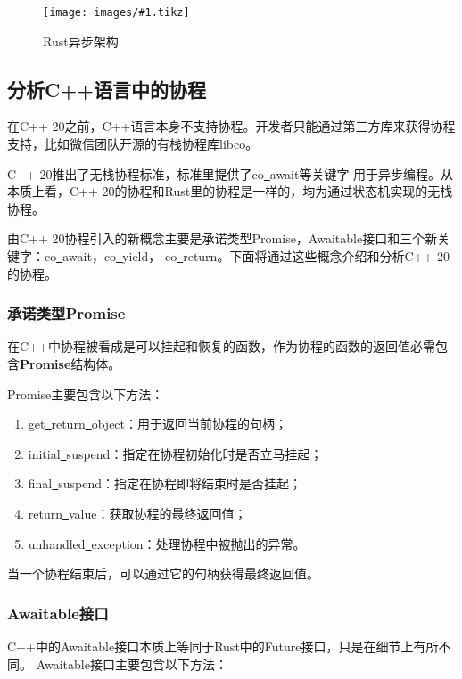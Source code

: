 \documentclass[supercite]{HustGraduPaper}
\newcommand{\cfig}[3]{
  \begin{figure}[htb]
    \centering
    \texttt{[image: images/\#1.tikz]}
    \caption{#3}
    \label{fig:#1}
  \end{figure}
}
\theoremstyle{definition}
\begin{document}
\cfig{rust-async}{0.9}{Rust异步架构}

\subsection{分析C++语言中的协程}
在C++ 20之前，C++语言本身不支持协程。开发者只能通过第三方库来获得协程支持，比如微信团队开源的有栈协程库libco。\par

C++ 20推出了无栈协程标准，标准里提供了co\underline{~}await等关键字
用于异步编程。从本质上看，C++ 20的协程和Rust里的协程是一样的，均为通过状态机实现的无栈协程。\par

由C++ 20协程引入的新概念主要是承诺类型Promise，Awaitable接口和三个新关键字：co\underline{~}await，co\underline{~}yield，
co\underline{~}return。下面将通过这些概念介绍和分析C++ 20的协程。\par

\subsubsection{承诺类型Promise}

在C++中协程被看成是可以挂起和恢复的函数，作为协程的函数的返回值必需包含\textbf{Promise}结构体。\par

Promise主要包含以下方法：

\begin{enumerate}
  \item get\underline{~}return\underline{~}object：用于返回当前协程的句柄；
  \item initial\underline{~}suspend：指定在协程初始化时是否立马挂起；
  \item final\underline{~}suspend：指定在协程即将结束时是否挂起；
  \item return\underline{~}value：获取协程的最终返回值；
  \item unhandled\underline{~}exception：处理协程中被抛出的异常。
\end{enumerate}

当一个协程结束后，可以通过它的句柄获得最终返回值。\par

\subsubsection{Awaitable接口}

C++中的Awaitable接口本质上等同于Rust中的Future接口，只是在细节上有所不同。
Awaitable接口主要包含以下方法：
\end{document}
